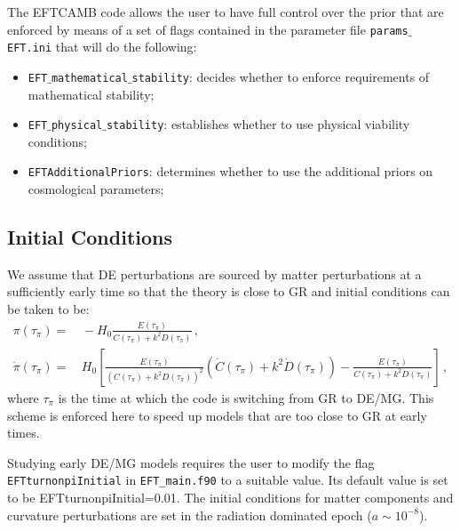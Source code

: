 \documentclass[prd,nofootinbib,showpacs]{revtex4}
\def\l{\left}
\def\r{\right}
\def\f{\frac}
\begin{document}
{The EFTCAMB code allows the user to have full control over the prior that are enforced by means of a set of flags contained in the parameter file \texttt{params$\_$EFT.ini} that will do the following:
%
\begin{itemize}
\item \texttt{EFT$\_$mathematical$\_$stability}: decides whether to enforce requirements of mathematical stability;
\item \texttt{EFT$\_$physical$\_$stability}: establishes whether to use physical viability conditions;
\item \texttt{EFTAdditionalPriors}: determines whether to use the additional priors on cosmological parameters;
\end{itemize}
%

\subsection{Initial Conditions}\label{SubSec:InitialConditions}
%
We assume that DE perturbations are sourced by matter perturbations at a sufficiently early time so that the theory is close to GR and initial conditions can be taken to be:
%
\begin{align}
\pi \l(\tau_\pi\r) =&\, -H_0 \f{E(\tau_\pi)}{C(\tau_\pi) +k^2 D(\tau_\pi)} \,,\nonumber \\
\dot{\pi} \l( \tau_\pi \r) =&\, H_0\l[\frac{E(\tau_\pi)}{(C(\tau_\pi)+k^2D(\tau_\pi))^2}(\dot{C}(\tau_\pi)+k^2\dot{D}(\tau_\pi))-\frac{\dot{E}(\tau_\pi)}{C(\tau_\pi)+k^2D(\tau_\pi)}\right] \,,
\end{align}
%
where $\tau_\pi$ is the time at which the code is switching from GR to DE/MG. This scheme is enforced here to speed up models that are too close to GR at early times. 


Studying early DE/MG models requires the user to modify the flag \verb|EFTturnonpiInitial| in \verb|EFT_main.f90| to a suitable value. Its default value is set to be  EFTturnonpiInitial=0.01. The  initial conditions for matter components and curvature perturbations are set in the radiation dominated epoch ($a \sim 10^{-8}$). 

}
\end{document}
